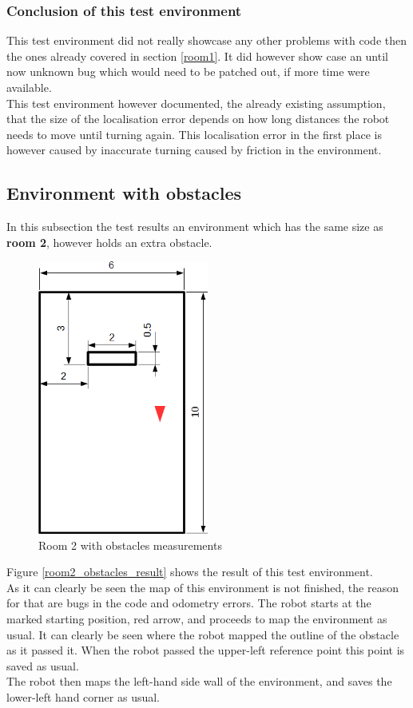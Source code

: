 \subsubsection{Conclusion of this test environment}
This test environment did not really showcase any other problems with code then the ones already covered in section \ref{room1}. It did however show case an until now unknown bug which would need to be patched out, if more time were available.\\
This test environment however documented, the already existing assumption, that the size of the localisation error depends on how long distances the robot needs to move until turning again. This localisation error in the first place is however caused by inaccurate turning caused by friction in the environment.

\subsection{Environment with obstacles}
In this subsection the test results an environment which has the same size as \textbf{room 2}, however holds an extra obstacle.\\

\begin{figure}[h]
\centering
\includegraphics[width = 0.5\textwidth]{../../figures/room2_obstacle.png}
\caption{Room 2 with obstacles measurements}
\label{room2_obstacles}
\end{figure}

Figure \ref{room2_obstacles_result} shows the result of this test environment. \\
As it can clearly be seen the map of this environment is not finished, the reason for that are bugs in the code and odometry errors.
The robot starts at the marked starting position, red arrow, and proceeds to map the environment as usual. It can clearly be seen where the robot mapped the outline of the obstacle as it passed it. When the robot passed the upper-left reference point this point is saved as usual. \\
The robot then maps the left-hand side wall of the environment, and saves the lower-left hand corner as usual.\\


